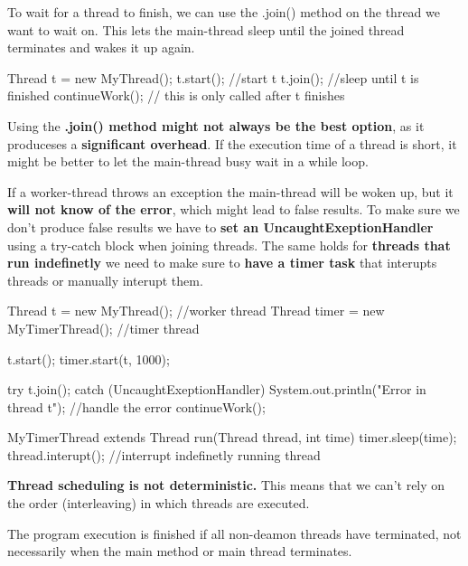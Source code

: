 To wait for a thread to finish, we can use the .join() method on the thread we want to wait on. This lets the main-thread sleep until the joined thread terminates and wakes it up again.

\begin{codeexample}
Thread t = new MyThread();
t.start(); //start t
t.join(); //sleep until t is finished
continueWork(); // this is only called after t finishes
\end{codeexample}

\begin{remark}
    Using the \textbf{.join() method might not always be the best option}, as it produceses a \textbf{significant overhead}.
    If the execution time of a thread is short, it might be better to let the main-thread busy wait in a while loop.
\end{remark}

\begin{important}
    If a worker-thread throws an exception the main-thread will be woken up, but it \textbf{will not know of the error}, which might lead to false results. To make sure we don't produce false results we have to \textbf{set an UncaughtExeptionHandler} using a try-catch block when joining threads. The same holds for \textbf{threads that run indefinetly} we need to make sure to \textbf{have a timer task} that interupts threads or manually interupt them.
\end{important}

\begin{codeexample}
Thread t = new MyThread(); //worker thread
Thread timer = new MyTimerThread(); //timer thread

t.start();
timer.start(t, 1000);

try {
    t.join();
} catch (UncaughtExeptionHandler) {
    System.out.println("Error in thread t"); //handle the error
}
continueWork();

MyTimerThread extends Thread {
    run(Thread thread, int time) {
        timer.sleep(time);
        thread.interupt(); //interrupt indefinetly running thread
    }
}    
\end{codeexample}

\begin{important}
    \textbf{Thread scheduling is not deterministic.} This means that we can't rely on the order (interleaving) in which threads are executed.
\end{important}

\begin{important}
    The program execution is finished if all non-deamon threads have terminated, not necessarily when the main method or main thread terminates.
\end{important}